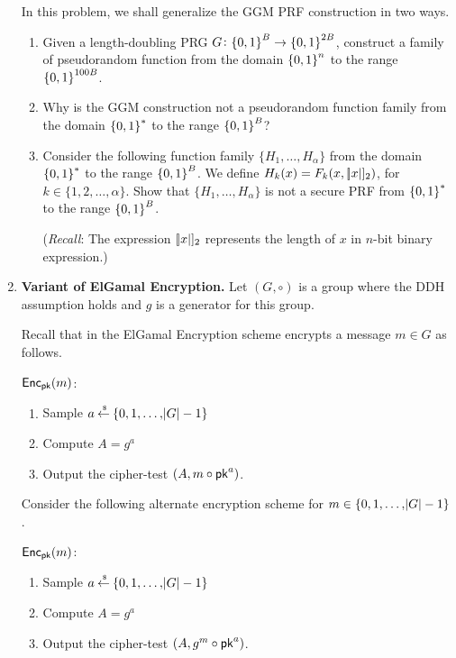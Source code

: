 \documentclass[11pt]{article}
\newcommand{\nextoddpage}{\checkoddpage\ifoddpage{\ \newpage\ \newpage}\else{\ \newpage}\fi}
\begin{document}
\begin{enumerate}
  In this problem, we shall generalize the GGM PRF construction in two ways. 
  \begin{enumerate}
  \item Given a length-doubling PRG $G\colon{\{0,1\}}^B\to{\{0,1\}}^{2B}$, construct a family of pseudorandom function from the domain ${\{0,1\}}^n$ to the range ${\{0,1\}}^{100B}$. 
  \item Why is the GGM construction not a pseudorandom function family from the domain ${\{0,1\}}^*$ to the range ${\{0,1\}}^B$? 
  \item Consider the following function family $\{H_1,\dotsc,H_\alpha\}$ from the domain ${\{0,1\}}^*$ to the range ${\{0,1\}}^B$. 
    We define $H_k(x) = F_k(x , [\abs x]_2)$, for $k\in\{1,2,\dotsc,\alpha\}$. 
    Show that $\{H_1,\dotsc,H_\alpha\}$ is not a secure PRF from ${\{0,1\}}^*$ to the range ${\{0,1\}}^B$. 
    
    ({\footnotesize {\em Recall}: The expression $[\abs x]_2$ represents the length of $x$ in $n$-bit binary expression.}) 
  \end{enumerate} 
  
  
\nextoddpage 
\item {\bfseries Variant of ElGamal Encryption.} 
  Let $(G,\circ)$ is a group where the DDH assumption holds and $g$ is a generator for this group. 
  
  Recall that in the ElGamal Encryption scheme encrypts a message $m\in G$ as follows.
  \begin{boxedalgo}
  $\mathsf{Enc}_\mathsf{pk}(m)$:
  \begin{enumerate}
  \item Sample $a\mathbin{\stackrel{\mbox{\,\tiny \$}}{\gets}}\{0,1,\dots,\abs G-1\}$ 
  \item Compute $A = g^a$ 
  \item Output the cipher-test $(A, m\circ \mathsf{pk}^a)$. 
  \end{enumerate} 
  \end{boxedalgo} 
  
  Consider the following alternate encryption scheme for $m\in\{0,1,\dotsc,\abs G-1\}$.
  \begin{boxedalgo}
  $\mathsf{Enc}_\mathsf{pk}(m)$:
  \begin{enumerate}
  \item Sample $a\mathbin{\stackrel{\mbox{\,\tiny \$}}{\gets}}\{0,1,\dots,\abs G-1\}$ 
  \item Compute $A = g^a$ 
  \item Output the cipher-test $(A, g^m\circ \mathsf{pk}^a)$. 
  \end{enumerate} 
  \end{boxedalgo} 
  

\end{enumerate}
\end{document}
